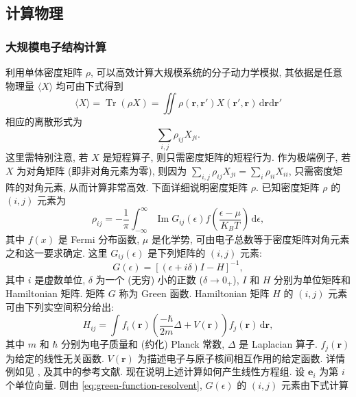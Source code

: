 \subsection{{计算物理}}\label{sec:computational-physics}
\subsubsection{{大规模电子结构计算}}\label{subsec:electronic-structure}
{利用单体密度矩阵 $\rho$, 可以高效计算大规模系统的分子动力学模拟, 其依据是任意物理量 $\langle X\rangle$ 均可由下式得到}
\[\langle X\rangle=\operatorname{Tr}(\rho X)=\iint\rho(\boldsymbol{r},\boldsymbol{r}')X(\boldsymbol{r}',\boldsymbol{r})\,\mathrm d\boldsymbol{r}\mathrm d\boldsymbol{r}'\]
{相应的离散形式为}
\[\sum_{i,j}\rho_{ij}X_{ji}.\]
{这里需特别注意, 若 $X$ 是短程算子, 则只需密度矩阵的短程行为. 作为极端例子, 若 $X$ 为对角矩阵 (即非对角元素为零), 则因为 $\sum_{i,j}\rho_{ij}X_{ji}=\sum_i\rho_{ii}X_{ii}$, 只需密度矩阵的对角元素, 从而计算非常高效.}
{下面详细说明密度矩阵 $\rho$. 已知密度矩阵 $\rho$ 的 $(i,j)$ 元素为}
\begin{equation}\label{eq:density-matrix-green-integral}
\rho_{ij}=-\frac1\pi\int_{-\infty}^{\infty}\operatorname{Im}G_{ij}(\epsilon)f\left(\frac{\epsilon-\mu}{K_BT}\right)\,\mathrm d\epsilon,
\end{equation}
{其中 $f(x)$ 是 Fermi 分布函数, $\mu$ 是化学势, 可由电子总数等于密度矩阵对角元素之和这一要求确定. 这里 $G_{ij}(\epsilon)$ 是下列矩阵的 $(i,j)$ 元素:}
\begin{equation}\label{eq:green-function-resolvent}
G(\epsilon)=[(\epsilon+i\delta)I-H]^{-1},
\end{equation}
{其中 $i$ 是虚数单位, $\delta$ 为一个 (无穷) 小的正数 ($\delta\to0_+$), $I$ 和 $H$ 分别为单位矩阵和 Hamiltonian 矩阵. 矩阵 $G$ 称为 Green 函数. Hamiltonian 矩阵 $H$ 的 $(i,j)$ 元素可由下列实空间积分给出:}
\[H_{ij}=\int f_i(\boldsymbol{r})\left(\frac{-\hbar}{2m}\Delta+V(\boldsymbol{r})\right)f_j(\boldsymbol{r})\,\mathrm d\boldsymbol{r},\]
{其中 $m$ 和 $\hbar$ 分别为电子质量和 (约化) Planck 常数, $\Delta$ 是 Laplacian 算子. $f_j(\boldsymbol{r})$ 为给定的线性无关函数. $V(\boldsymbol{r})$ 为描述电子与原子核间相互作用的给定函数. 详情例如见 ,  及其中的参考文献.}
{\leavevmode{}\label{srcpage:printed-52}现在说明上述计算如何产生线性方程组. 设 $\boldsymbol{e}_i$ 为第 $i$ 个单位向量. 则由 \eqref{eq:green-function-resolvent}, $G(\epsilon)$ 的 $(i,j)$ 元素由下式计算}
